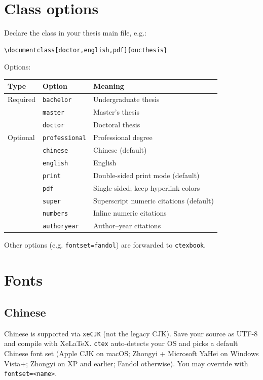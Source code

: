 \documentclass[12pt]{article}
\begin{document}
\section{Class options}
Declare the class in your thesis main file, e.g.:
\begin{lstlisting}[language={[LaTeX]TeX}]
\documentclass[doctor,english,pdf]{oucthesis}
\end{lstlisting}
Options:
\begin{center}
\begin{tabular}{@{}lll@{}}
\toprule
Type & Option & Meaning\\
\midrule
Required & \texttt{bachelor} & Undergraduate thesis\\
         & \texttt{master} & Master’s thesis\\
         & \texttt{doctor} & Doctoral thesis\\
\midrule
Optional & \texttt{professional} & Professional degree\\
         & \texttt{chinese} & Chinese (default)\\
         & \texttt{english} & English\\
         & \texttt{print} & Double-sided print mode (default)\\
         & \texttt{pdf} & Single-sided; keep hyperlink colors\\
         & \texttt{super} & Superscript numeric citations (default)\\
         & \texttt{numbers} & Inline numeric citations\\
         & \texttt{authoryear} & Author–year citations\\
\bottomrule
\end{tabular}
\end{center}
Other options (e.g. \lstinline|fontset=fandol|) are forwarded to \texttt{ctexbook}.

\section{Fonts}
\subsection*{Chinese}
Chinese is supported via \texttt{xeCJK} (not the legacy CJK). Save your source as UTF-8 and compile with XeLaTeX. \texttt{ctex} auto-detects your OS and picks a default Chinese font set (Apple CJK on macOS; Zhongyi + Microsoft YaHei on Windows Vista+; Zhongyi on XP and earlier; Fandol otherwise). You may override with \lstinline|fontset=<name>|.
\end{document}
